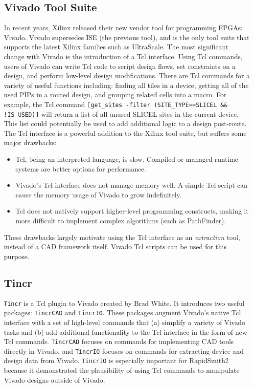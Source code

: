 \subsection{Vivado Tool Suite}
In recent years, Xilinx released their new vendor tool for programming FPGAs:
Vivado. Vivado supersedes ISE (the previous tool), and is the only tool suite
that supports the latest Xilinx families such as UltraScale. The most
significant change with Vivado is the introduction of a Tcl interface. Using
Tcl commands, users of Vivado can write Tcl code to script design flows, set
constraints on a design, and perform low-level design modifications. There are
Tcl commands for a variety of useful functions including: finding all tiles in
a device, getting all of the used PIPs in a routed design, and grouping related
cells into a macro. For example, the Tcl command \texttt{[get\_sites -filter
(SITE\_TYPE==SLICEL \&\& !IS\_USED)]} will return a list of all unused SLICEL
sites in the current device. This list could potentially be used to add
additional logic to a design post-route. The Tcl interface is a powerful
addition to the Xilinx tool suite, but suffers some major drawbacks:

\begin {itemize}
  \item Tcl, being an interpreted language, is slow. Compiled or managed runtime
  systems are better options for performance.
  \item Vivado's Tcl interface does not manage memory well. A simple Tcl script
  can cause the memory usage of Vivado to grow indefinitely.
  \item Tcl does not natively support higher-level programming constructs,
  making it more difficult to implement complex algorithms (such as
  PathFinder).
\end{itemize}

\noindent These drawbacks largely motivate using the Tcl interface as an
\textit{extraction} tool, instead of a CAD framework itself. Vivado Tcl scripts
can be used for this purpose.

\subsection{Tincr}
\texttt{Tincr} is a Tcl plugin to Vivado created by
Brad White. It introduces two useful packages: \texttt{TincrCAD} and
\texttt{TincrIO}. These packages augment Vivado's native Tcl interface with a
set of high-level commands that (a) simplify a variety of Vivado tasks and (b)
add additional functionality to the Tcl interface in the form of new Tcl
commands. \texttt{TincrCAD} focuses on commands for implementing CAD tools
directly in Vivado, and \texttt{TincrIO} focuses on commands for extracting
device and design data from Vivado. \texttt{TincrIO} is especially important
for RapidSmith2 because it demonstrated the plausibility of using
Tcl commands to manipulate Vivado designs outside of Vivado.

